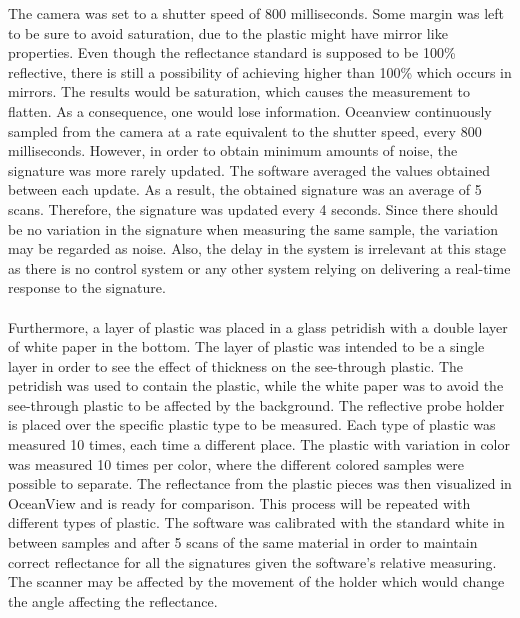 The camera was set to a shutter speed of 800 milliseconds. Some margin was left to be sure to avoid saturation, due to the plastic might have mirror like properties. Even though the reflectance standard is supposed to be 100\% reflective, there is still a possibility of achieving higher than 100\% which occurs in mirrors. The results would be saturation, which causes the measurement to flatten. As a consequence, one would lose information. Oceanview continuously sampled from the camera at a rate equivalent to the shutter speed, every 800 milliseconds. However, in order to obtain minimum amounts of noise, the signature was more rarely updated. The software averaged the values obtained between each update. As a result, the obtained signature was an average of 5 scans. Therefore, the signature was updated every 4 seconds. Since there should be no variation in the signature when measuring the same sample, the variation may be regarded as noise. Also, the delay in the system is irrelevant at this stage as there is no control system or any other system relying on delivering a real-time response to the signature.
\\\\
Furthermore, a layer of plastic was placed in a glass petridish with a double layer of white paper in the bottom. The layer of plastic was intended to be a single layer in order to see the effect of thickness on the see-through plastic. The petridish was used to contain the plastic, while the white paper was to avoid the see-through plastic to be affected by the background. The reflective probe holder is placed over the specific plastic type to be measured. Each type of plastic was measured 10 times, each time a different place. The plastic with variation in color was measured 10 times per color, where the different colored samples were possible to separate. The reflectance from the plastic pieces was then visualized in OceanView and is ready for comparison. This process will be repeated with different types of plastic. The software was calibrated with the standard white in between samples and after 5 scans of the same material in order to maintain correct reflectance for all the signatures given the software's relative measuring. The scanner may be affected by the movement of the holder which would change the angle affecting the reflectance. 
\\\\
